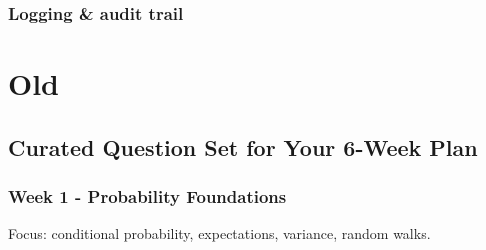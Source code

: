 \documentclass{report}
\begin{document}
\subsection*{Logging \& audit trail}


\newpage

\chapter{Old}

\section{Curated Question Set for Your 6-Week Plan}

\subsection*{Week 1 - Probability Foundations}

Focus: conditional probability, expectations, variance, random walks.

\end{document}

